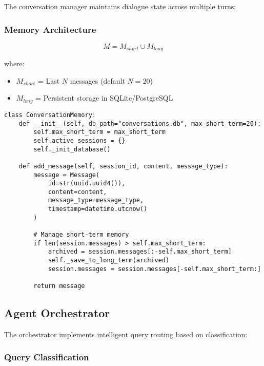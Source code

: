 \documentclass[12pt,a4paper]{article}
\begin{document}
The conversation manager maintains dialogue state across multiple turns:

\subsubsection{Memory Architecture}

\begin{equation}
    M = M_{short} \cup M_{long}
\end{equation}

where:
\begin{itemize}
    \item $M_{short}$ = Last $N$ messages (default $N=20$)
    \item $M_{long}$ = Persistent storage in SQLite/PostgreSQL
\end{itemize}

\begin{lstlisting}[caption={Conversation Memory Implementation}]
class ConversationMemory:
    def __init__(self, db_path="conversations.db", max_short_term=20):
        self.max_short_term = max_short_term
        self.active_sessions = {}
        self._init_database()
    
    def add_message(self, session_id, content, message_type):
        message = Message(
            id=str(uuid.uuid4()),
            content=content,
            message_type=message_type,
            timestamp=datetime.utcnow()
        )
        
        # Manage short-term memory
        if len(session.messages) > self.max_short_term:
            archived = session.messages[:-self.max_short_term]
            self._save_to_long_term(archived)
            session.messages = session.messages[-self.max_short_term:]
        
        return message
\end{lstlisting}

\subsection{Agent Orchestrator}

The orchestrator implements intelligent query routing based on classification:

\subsubsection{Query Classification}
\end{document}
